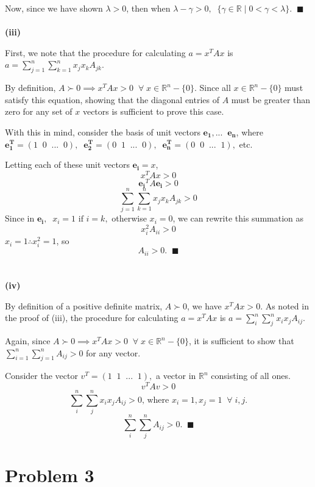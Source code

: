 \documentclass{report}
\begin{document}
Now, since we have shown $\lambda > 0$, then when $\lambda - \gamma > 0, \;\; \{\gamma \in \mathbb{R} \;| \;0 < \gamma < \lambda\}. \;\; \blacksquare$
\-\\
\-\\
\textbf{(iii)}

First, we note that the procedure for calculating $a = x^TAx$ is $a = \sum_{j=1}^n{\sum_{k=1}^n{x_j x_k A_{jk}}}$.

By definition, $A \succ 0 \implies x^TAx > 0 \;\;\forall\; x \in \mathbb{R}^{n}-\{0\}.$ Since all $x \in \mathbb{R}^{n}-\{0\}$ must satisfy this equation, showing that the diagonal entries of $A$ must be greater than zero for any set of $x$ vectors is sufficient to prove this case.

With this in mind, consider the basis of unit vectors ${\bm{e_1},...\;\;\bm{e_n}}$, where $\bm{e_1^T} = (1\;\;0\;\;... \;\;0), \;\;\bm{e_2^T} = (0\;\;1\;\;... \;\;0), \;\;\bm{e_n^T} = (0\;\;0\;\;... \;\;1),$ etc.

Letting each of these unit vectors $\bm{e_i} = x$,
$$ x^TAx > 0 $$
$$ \bm{e_i}^TA\bm{e_i} > 0 $$
$$ \sum_{j=1}^n{\sum_{k=1}^n{x_j x_k A_{jk}}} > 0 $$
Since in $\bm{e_i}, \;\; x_i = 1 \text{ if } i = k,$ otherwise $ x_i = 0$, we can rewrite this summation as 
$$ x_i^2 A_{ii} > 0 $$
$x_i = 1 \therefore x_i^2 = 1$, so 
$$ A_{ii} > 0. \;\; \blacksquare $$
\-\\
\-\\
\textbf{(iv)}

By definition of a positive definite matrix, $A \succ 0$, we have $x^TAx > 0$. As noted in the proof of (iii), the procedure for calculating $ a = x^TAx$ is $a = \sum_i^n{\sum_j^n{x_i x_j A_{ij}}}$. 

Again, since $A \succ 0 \implies x^TAx > 0 \;\;\forall\; x \in \mathbb{R}^{n}-\{0\}$, it is sufficient to show that $\sum_{i=1}^n{\sum_{j=1}^n{A_{ij}}} > 0$ for any vector.

Consider the vector $v^T = (1 \;\; 1 \;\; ... \;\; 1),$ a vector in $\mathbb{R}^{n}$ consisting of all ones. 
$$ v^TAv > 0 $$
$$ \sum_i^n{\sum_j^n{x_i x_j A_{ij}}} > 0\text{, where } x_i = 1, x_j = 1 \;\;\forall\; i,j. $$
$$ \sum_i^n{\sum_j^n{A_{ij}}} > 0. \;\; \blacksquare$$



\newpage
\section*{Problem 3}
\end{document}
